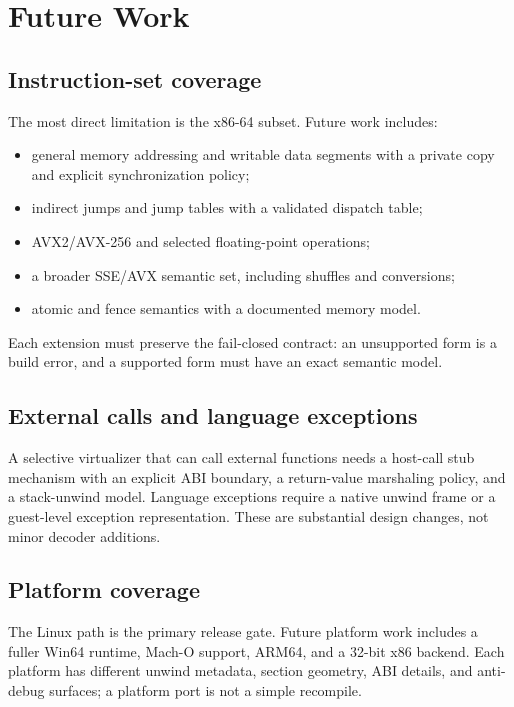 \section{Future Work}
\label{sec:future}

\subsection{Instruction-set coverage}

The most direct limitation is the x86-64 subset. Future work includes:

\begin{itemize}
  \item general memory addressing and writable data segments with a private
        copy and explicit synchronization policy;
  \item indirect jumps and jump tables with a validated dispatch table;
  \item AVX2/AVX-256 and selected floating-point operations;
  \item a broader SSE/AVX semantic set, including shuffles and conversions;
  \item atomic and fence semantics with a documented memory model.
\end{itemize}

Each extension must preserve the fail-closed contract: an unsupported form is a
build error, and a supported form must have an exact semantic model.

\subsection{External calls and language exceptions}

A selective virtualizer that can call external functions needs a host-call stub
mechanism with an explicit ABI boundary, a return-value marshaling policy, and a
stack-unwind model. Language exceptions require a native unwind frame or a
guest-level exception representation. These are substantial design changes, not
minor decoder additions.

\subsection{Platform coverage}

The Linux path is the primary release gate. Future platform work includes a
fuller Win64 runtime, Mach-O support, ARM64, and a 32-bit x86 backend. Each
platform has different unwind metadata, section geometry, ABI details, and
anti-debug surfaces; a platform port is not a simple recompile.

